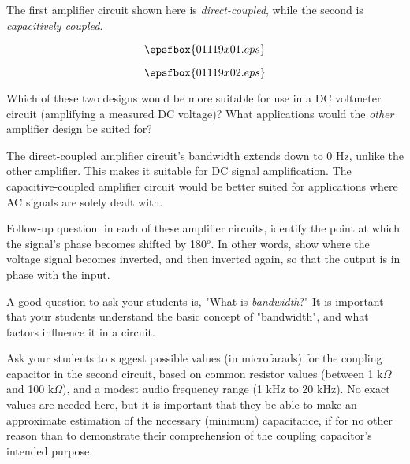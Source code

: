 

The first amplifier circuit shown here is {\it direct-coupled}, while the second is {\it capacitively coupled}.  

$$\epsfbox{01119x01.eps}$$

$$\epsfbox{01119x02.eps}$$

Which of these two designs would be more suitable for use in a DC voltmeter circuit (amplifying a measured DC voltage)?  What applications would the {\it other} amplifier design be suited for? 







The direct-coupled amplifier circuit's bandwidth extends down to 0 Hz, unlike the other amplifier.  This makes it suitable for DC signal amplification.  The capacitive-coupled amplifier circuit would be better suited for applications where AC signals are solely dealt with.

Follow-up question: in each of these amplifier circuits, identify the point at which the signal's phase becomes shifted by 180$^{o}$.  In other words, show where the voltage signal becomes inverted, and then inverted again, so that the output is in phase with the input.







A good question to ask your students is, "What is {\it bandwidth}?"  It is important that your students understand the basic concept of "bandwidth", and what factors influence it in a circuit. 

Ask your students to suggest possible values (in microfarads) for the coupling capacitor in the second circuit, based on common resistor values (between 1 k$\Omega$ and 100 k$\Omega$), and a modest audio frequency range (1 kHz to 20 kHz).  No exact values are needed here, but it is important that they be able to make an approximate estimation of the necessary (minimum) capacitance, if for no other reason than to demonstrate their comprehension of the coupling capacitor's intended purpose.




